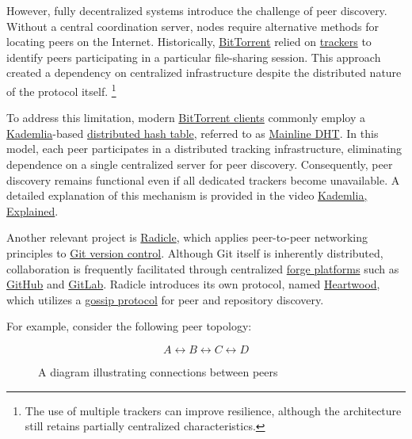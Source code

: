 \documentclass[a4paper, 10pt]{article}
\begin{document}
However, fully decentralized systems introduce the challenge of peer discovery.
Without a central coordination server, nodes require alternative methods for locating peers on the Internet.
Historically, \href{https://en.wikipedia.org/wiki/BitTorrent}{BitTorrent}
relied on \href{https://en.wikipedia.org/wiki/BitTorrent_tracker}{trackers}
to identify peers participating in a particular file-sharing session.
This approach created a dependency on centralized infrastructure despite the distributed nature of the protocol itself.
\footnote{The use of multiple trackers can improve resilience, although the architecture still retains partially centralized characteristics.}

To address this limitation, modern
\href{https://en.wikipedia.org/wiki/Comparison_of_BitTorrent_clients}{BitTorrent clients}
commonly employ a \href{https://en.wikipedia.org/wiki/Kademlia}{Kademlia}-based
\href{https://en.wikipedia.org/wiki/Distributed_hash_table}{distributed hash table},
referred to as \href{https://en.wikipedia.org/wiki/Mainline_DHT}{Mainline DHT}.
In this model, each peer participates in a distributed tracking infrastructure,
eliminating dependence on a single centralized server for peer discovery.
Consequently, peer discovery remains functional even if all dedicated trackers become unavailable.
A detailed explanation of this mechanism is provided in the video
\href{https://www.youtube.com/watch?v=1QdKhNpsj8M}{Kademlia, Explained}.

Another relevant project is \href{https://radicle.xyz/}{Radicle},
which applies peer-to-peer networking principles to
\href{https://en.wikipedia.org/wiki/Git}{Git version control}.
Although Git itself is inherently distributed, collaboration is frequently facilitated through centralized
\href{https://en.wikipedia.org/wiki/Forge_(software)}{forge platforms}
such as \href{https://github.com/}{GitHub} and \href{https://about.gitlab.com/}{GitLab}.
Radicle introduces its own protocol, named
\href{https://app.radicle.xyz/nodes/iris.radicle.xyz/rad%3Az3gqcJUoA1n9HaHKufZs5FCSGazv5}{Heartwood},
which utilizes a \href{https://radicle.xyz/guides/protocol}{gossip protocol}
for peer and repository discovery.

\newpage

For example, consider the following peer topology:

\begin{figure}[H]
  $$ A \leftrightarrow B \leftrightarrow C \leftrightarrow D $$
  \caption{A diagram illustrating connections between peers}
\end{figure}
\end{document}
